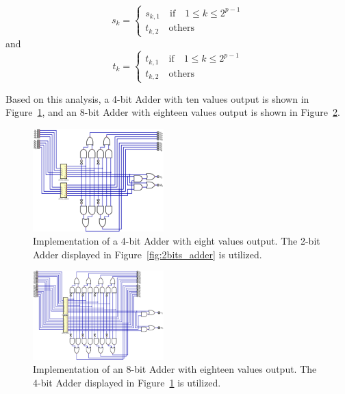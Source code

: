 \documentclass[conference]{IEEEtran}
\begin{document}
\begin{itemize}
\begin{equation}
        s_k = \begin{cases}
            s_{k,1} \quad \text{if} \quad 1 \leq k \leq 2^{p-1} \\
            t_{k,2} \quad \text{others}
        \end{cases}
    \end{equation}
    and
    \begin{equation}
        t_k = \begin{cases}
            t_{k,1} \quad \text{if} \quad 1 \leq k \leq 2^{p-1} \\
            t_{k,2} \quad \text{others}
        \end{cases}
    \end{equation} 
\end{itemize}

Based on this analysis, a 4-bit Adder with ten values output is shown in Figure~\ref{fig:4bits_adder}, and an 8-bit Adder with eighteen values output is shown in Figure~\ref{fig:8bits_adder}.


\begin{figure}[h!]
\centering
\includegraphics[width=0.45\textwidth]{assets/4bits_adder.png}
\caption{Implementation of a 4-bit Adder with eight values output. The 2-bit Adder displayed in Figure~\ref{fig:2bits_adder} is utilized.}
\label{fig:4bits_adder}
\end{figure}

\begin{figure}[h!]
\centering
\includegraphics[width=0.45\textwidth]{assets/8bits_adder.png}
\caption{Implementation of an 8-bit Adder with eighteen values output. The 4-bit Adder displayed in Figure~\ref{fig:4bits_adder} is utilized.}
\label{fig:8bits_adder}
\end{figure}
\end{document}
